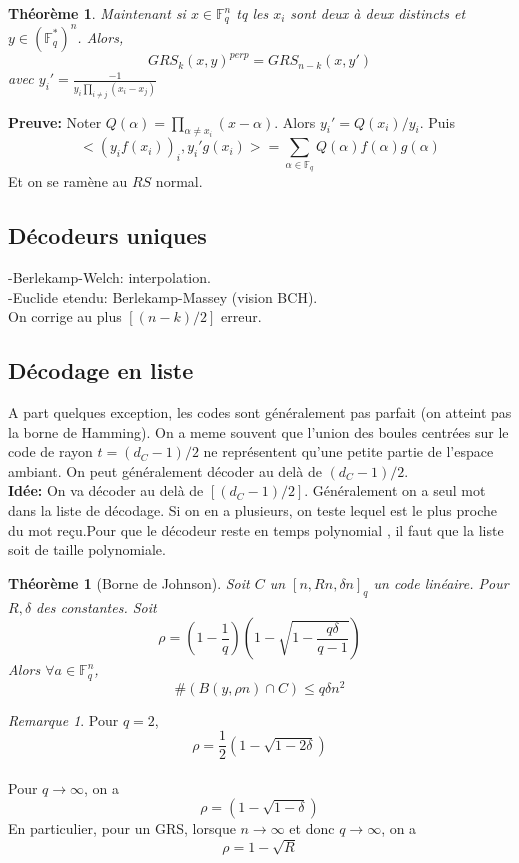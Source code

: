 \documentclass[12pt]{article}
\theoremstyle{plain}
\newtheorem{thm}[subsubsection]{Th\'eor\`eme}
\theoremstyle{definition}
\theoremstyle{remark}
\newtheorem{rem}{Remarque}
\newcommand{\F}{\mathbb{F}}
\begin{document}
\begin{thm}
    Maintenant si $x\in \F_q^n$ tq les $x_i$ sont deux 
    à deux distincts et $y\in (\F_q^*)^{n}$. Alors,
    \[GRS_k(x,y)^{perp}=GRS_{n-k}(x,y')\]
    avec $y_i'=\frac{-1}{y_i\prod_{i\ne j}(x_i-x_j)}$
\end{thm}
\textbf{Preuve:} Noter $Q(\alpha)=\prod_{\alpha\ne x_i}(x-\alpha)$.
Alors $y_i'=Q(x_i)/y_i$. Puis 
\[
    <(y_if(x_i))_i, y_i'g(x_i)>=\sum_{\alpha\in \F_q} Q(\alpha)f(\alpha)g(\alpha)
\]
Et on se ramène au $RS$ normal.

\subsection{Décodeurs uniques}
-Berlekamp-Welch: interpolation.\\
-Euclide etendu: Berlekamp-Massey (vision BCH).\\

On corrige au plus $[(n-k)/2]$ erreur.

\subsection{Décodage en liste}
A part quelques exception, les codes sont généralement
pas parfait (on atteint pas la borne de Hamming). On a 
meme souvent que l'union des boules centrées sur le code
de rayon $t=(d_C-1)/2$ ne représentent qu'une petite partie 
de l'espace ambiant. On peut généralement décoder au 
delà de $(d_C-1)/2$.\\

\textbf{Idée:} On va décoder au delà de $[(d_C-1)/2]$.
Généralement on a seul mot dans la liste de décodage.
Si on en a plusieurs, on teste lequel est le plus proche 
du mot reçu.Pour que le décodeur reste en temps polynomial
, il faut que la liste soit de taille polynomiale.

\begin{thm}[Borne de Johnson]
    Soit $C$ un $[n,Rn, \delta n]_q$ un code linéaire. 
    Pour $R,\delta$ des constantes. Soit 
    \[\rho =(1-\frac{1}{q})\left(1-\sqrt{1-\frac{q\delta}{q-1}}\right)\]
    Alors $\forall a\in \F_q^n$,
    \[\#(B(y,\rho n)\cap C)\leq q\delta n^2\]
\end{thm}

\begin{rem}
    Pour $q=2$, \[\rho=\frac{1}{2}(1-\sqrt{1-2\delta})\]\\
    Pour $q\to \infty$, on a 
    \[\rho=(1-\sqrt{1-\delta})\]
    En particulier, pour un GRS, lorsque $n\to\infty$
    et donc $q\to \infty$, on a 
    \[\rho=1-\sqrt{R}\] 
\end{rem}
\end{document}

